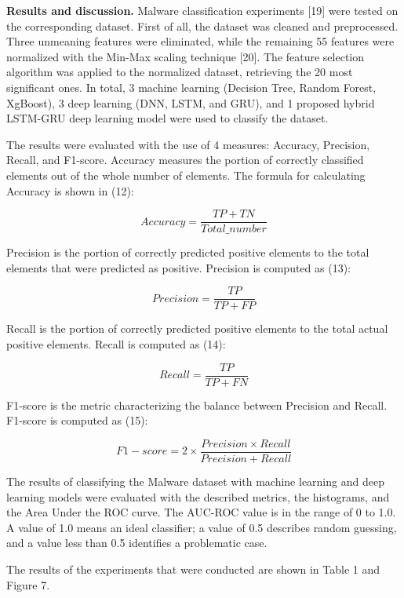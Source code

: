 \begin{multicols}{2}
{\bfseries Results and discussion.} Malware classification experiments
{[}19{]} were tested on the corresponding dataset. First of all, the
dataset was cleaned and preprocessed. Three unmeaning features were
eliminated, while the remaining 55 features were normalized with the
Min-Max scaling technique {[}20{]}. The feature selection algorithm was
applied to the normalized dataset, retrieving the 20 most significant
ones. In total, 3 machine learning (Decision Tree, Random Forest,
XgBoost), 3 deep learning (DNN, LSTM, and GRU), and 1 proposed hybrid
LSTM-GRU deep learning model were used to classify the dataset.

The results were evaluated with the use of 4 measures: Accuracy,
Precision, Recall, and F1-score. Accuracy measures the portion of
correctly classified elements out of the whole number of elements. The
formula for calculating Accuracy is shown in (12):

\begin{equation}
Accuracy=\frac{TP+TN}{Total \text{\_} number}
\end{equation}

Precision is the portion of correctly predicted positive elements to the
total elements that were predicted as positive. Precision is computed as
(13):

\begin{equation}
Precision=\frac{TP}{TP+FP}
\end{equation}

Recall is the portion of correctly predicted positive elements to the
total actual positive elements. Recall is computed as (14):

\begin{equation}
Recall=\frac{TP}{TP+FN}
\end{equation}

F1-score is the metric characterizing the balance between Precision and
Recall. F1-score is computed as (15):

\begin{equation}
F1- score =2\times\frac{Precision \times Recall}{Precision + Recall}
\end{equation}

The results of classifying the Malware dataset with machine learning and
deep learning models were evaluated with the described metrics, the
histograms, and the Area Under the ROC curve. The AUC-ROC value is in
the range of 0 to 1.0. A value of 1.0 means an ideal classifier; a value
of 0.5 describes random guessing, and a value less than 0.5 identifies a
problematic case.

The results of the experiments that were conducted are shown in Table 1
and Figure 7.
\end{multicols}

